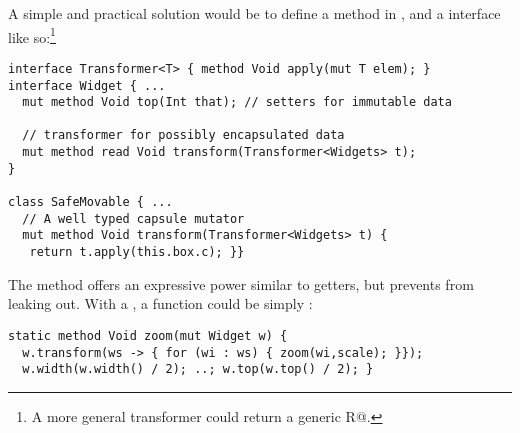 A simple and practical solution would be to define a \Q@transform@ method in \Q@Widget@, and a \Q@Transformer@ interface 
like so:\footnote{A more general transformer could return a generic \Q@read R@.}
\begin{lstlisting}
interface Transformer<T> { method Void apply(mut T elem); }
interface Widget { ...
  mut method Void top(Int that); // setters for immutable data
  
  // transformer for possibly encapsulated data
  mut method read Void transform(Transformer<Widgets> t);
}

class SafeMovable { ...
  // A well typed capsule mutator
  mut method Void transform(Transformer<Widgets> t) {
   return t.apply(this.box.c); }}
\end{lstlisting}\saveSpace
The \Q@transform@ method offers an expressive power similar to \Q@mut@ getters, but prevents \Q@Widgets@ from leaking out.  With a \Q@Transformer@, a \Q@zoom@ function could be simply :
\begin{lstlisting}
static method Void zoom(mut Widget w) {
  w.transform(ws -> { for (wi : ws) { zoom(wi,scale); }});
  w.width(w.width() / 2); ..; w.top(w.top() / 2); }
\end{lstlisting}




